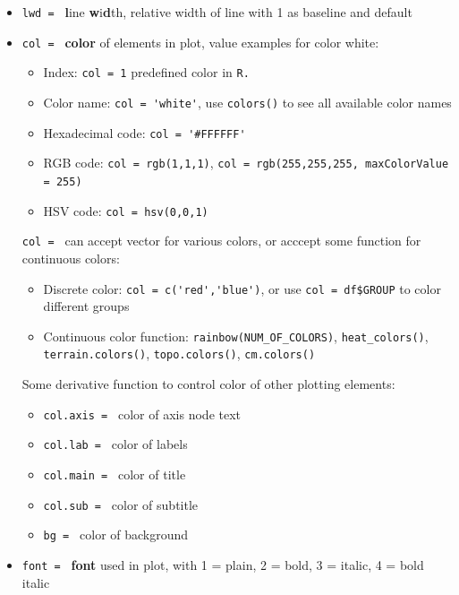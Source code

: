 \begin{itemize}[topsep=2pt,itemsep=0pt]
\begin{itemize}[topsep=2pt,itemsep=0pt]
        \item \lstinline|lwd = | \textbf{l}ine \textbf{w}i\textbf{d}th, relative width of line with 1 as baseline and default
        \item \lstinline|col = | \textbf{color} of elements in plot, value examples for color white:
        \begin{itemize}[topsep=2pt,itemsep=0pt]
            \item Index: \lstinline|col = 1| predefined color in \lstinline|R.| 
            \item Color name: \lstinline|col = 'white'|, use \lstinline|colors()| to see all available color names
            \item Hexadecimal code: \lstinline|col = '#FFFFFF'|
            \item RGB code: \lstinline|col = rgb(1,1,1)|, \lstinline|col = rgb(255,255,255, maxColorValue = 255)|
            \item HSV code: \lstinline|col = hsv(0,0,1)|
        \end{itemize}

        \lstinline|col = | can accept vector for various colors, or acccept some function for continuous colors:
        \begin{itemize}[topsep=2pt,itemsep=0pt]
            \item Discrete color: \lstinline|col = c('red','blue')|, or use \lstinline|col = df$GROUP| to color different groups
            \item Continuous color function: \lstinline|rainbow(NUM_OF_COLORS)|, \lstinline|heat_colors()|, \lstinline|terrain.colors()|, \lstinline|topo.colors()|, \lstinline|cm.colors()|
        \end{itemize}

        Some derivative function to control color of other plotting elements:
        \begin{itemize}[topsep=2pt,itemsep=0pt]
            \item \lstinline|col.axis = | color of axis node text
            \item \lstinline|col.lab = | color of labels
            \item \lstinline|col.main = | color of title 
            \item \lstinline|col.sub = | color of subtitle 
            \item \lstinline|bg = | color of background
        \end{itemize}

        \item \lstinline|font = | \textbf{font} used in plot, with 1 = plain, 2 = bold, 3 = italic,
        4 = bold italic


\end{itemize}
\end{itemize}
